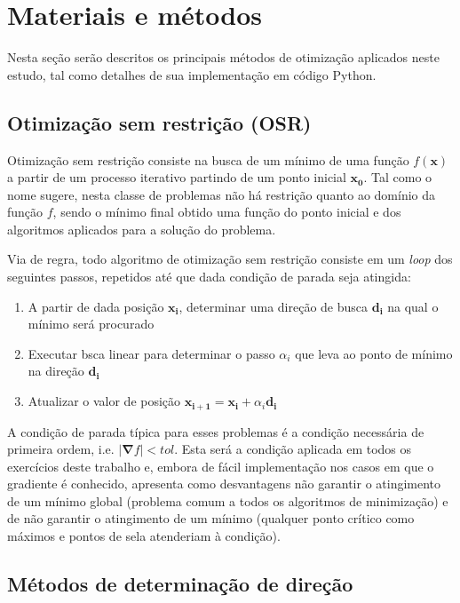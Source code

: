 \documentclass[10pt, a4paper]{article}
\begin{document}
\section{Materiais e métodos}

Nesta seção serão descritos os principais métodos de otimização aplicados neste estudo, tal como detalhes de sua implementação
em código Python.

\subsection{Otimização sem restrição (OSR)}

Otimização sem restrição consiste na busca de um mínimo de uma função $f(\mathbf{x})$ a partir de um processo iterativo partindo
de um ponto inicial $\mathbf{x_0}$. Tal como o nome sugere, nesta classe de problemas não há restrição quanto ao domínio da
função $f$, sendo o mínimo final obtido uma função do ponto inicial e dos algoritmos aplicados para a solução do problema.

Via de regra, todo algoritmo de otimização sem restrição consiste em um \textit{loop} dos seguintes passos, repetidos até que
dada condição de parada seja atingida:

\begin{enumerate}
  \item A partir de dada posição $\mathbf{x_i}$, determinar uma direção de busca $\mathbf{d_i}$ na qual o mínimo será procurado
  \item Executar bsca linear para determinar o passo $\alpha_i$ que leva ao ponto de mínimo na direção $\mathbf{d_i}$
  \item Atualizar o valor de posição $\mathbf{x_{i+1}} = \mathbf{x_i} + \alpha_i\mathbf{d_i}$
\end{enumerate}

A condição de parada típica para esses problemas é a condição necessária de primeira ordem, i.e. $|\mathbf{\nabla}f| < tol$.
Esta será a condição aplicada em todos os exercícios deste trabalho e, embora de fácil implementação nos casos em que o 
gradiente é conhecido, apresenta como desvantagens não garantir o atingimento de um mínimo global (problema comum a todos os
algoritmos de minimização) e de não garantir o atingimento de um mínimo (qualquer ponto crítico como máximos e pontos de sela
atenderiam à condição).

\subsection{Métodos de determinação de direção}
\end{document}
